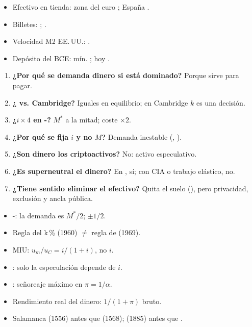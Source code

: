 \documentclass{article}
\begin{document}
\begin{columnas}
\anexorepaso
{}
\begin{itemize}
\item Efectivo en tienda: zona del euro ; España .
\item Billetes: ; .
\item Velocidad M2 EE.\,UU.: .
\item Depósito del BCE: mín. ; hoy .
\end{itemize}
\begin{enumerate}
\item \textbf{¿Por qué se demanda dinero si está dominado?} Porque sirve para pagar.
\item \textbf{¿ vs. Cambridge?} Iguales en equilibrio; en Cambridge $k$ es una decisión.
\item \textbf{¿$i\times4$ en -?} $M^*$ a la mitad; coste $\times2$.
\item \textbf{¿Por qué se fija $i$ y no $M$?} Demanda inestable (, ).
\item \textbf{¿Son dinero los criptoactivos?} No: activo especulativo.
\item \textbf{¿Es superneutral el dinero?} En , sí; con CIA o trabajo elástico, no.
\item \textbf{¿Tiene sentido eliminar el efectivo?} Quita el suelo (), pero privacidad, exclusión y ancla pública.
\end{enumerate}
\begin{trampa}
\begin{itemize}
\item {}-: la demanda es $M^*/2$; $\pm1/2$.
\item Regla del k\,\% (1960) $\neq$ regla de  (1969).
\item MIU: $u_m/u_C=i/(1+i)$, no $i$.
\item {}: solo la especulación depende de $i$.
\item {}: señoreaje máximo en $\pi=1/\alpha$.
\item Rendimiento real del dinero: $1/(1+\pi)$ bruto.
\item Salamanca (1556) antes que  (1568);  (1885) antes que .
\end{itemize}
\end{trampa}

\end{columnas}
\end{document}
